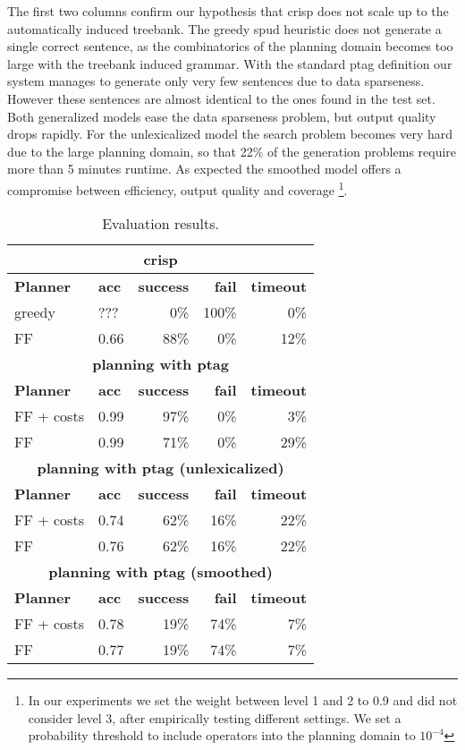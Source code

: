 The first two columns confirm our hypothesis that {\sc crisp} does not scale up to the automatically induced treebank. The greedy {\sc spud} heuristic does not generate a single correct sentence, as the combinatorics of the planning domain becomes too large with the treebank induced grammar. 
With the standard {\sc ptag} definition our system manages to generate only very few sentences due to data sparseness. However these sentences are almost identical to the ones found in the test set. Both generalized models ease the data sparseness problem, but output quality drops rapidly. For the unlexicalized model the search problem becomes very hard due to the large planning domain, so that 22\% of the generation problems require more than 5 minutes runtime. As expected the smoothed model offers a compromise between efficiency, output quality and coverage 
\footnote{In our experiments we set the weight between level 1 and 2 to 0.9 and did not consider level 3, after empirically testing different settings. We set a probability threshold to include operators into the planning domain to $10^{-4}$}.

\begin{table}
    \caption{\label{results} Evaluation results.}
    \begin{center}
    \begin{tabular}{|l|l|r|r|r|}
    \multicolumn{5}{c}{\sc crisp}\\ 
    \hline
     {\bf Planner }  & {\bf acc}& {\bf success} & {\bf fail} & {\bf timeout} \\ \hline 
     greedy         & ??? & 0\% & 100\% & 0\%  \\ \hline 
     FF         &  0.66 & 88\% & 0\% & 12\% \\ \hline 
    \multicolumn{5}{c}{\bf planning with {\sc ptag}}\\\hline
    {\bf Planner }  & {\bf acc}& {\bf success} & {\bf fail} & {\bf timeout} \\ \hline 
     FF + costs &  0.99 &  97\% & 0\% & 3\% \\ \hline
     FF         &  0.99 & 71\% & 0\% &  29\% \\ \hline
    \multicolumn{5}{c}{\bf planning with {\sc ptag} (unlexicalized)}\\\hline
    {\bf Planner }  & {\bf acc}& {\bf success} & {\bf fail} & {\bf timeout} \\ \hline 
     FF + costs & 0.74 & 62\% & 16\% & 22\%\\ \hline
     FF & 0.76 & 62\% & 16\% &  22\%\\ \hline
    \multicolumn{5}{c}{\bf planning with {\sc ptag} (smoothed)}\\\hline
    {\bf Planner }  & {\bf acc}& {\bf success} & {\bf fail} & {\bf timeout} \\ \hline 
     FF + costs & 0.78 & 19\% & 74\% & 7\% \\ \hline
     FF & 0.77 & 19\% & 74\% & 7\% \\ \hline
    \end{tabular}
    \end{center}
\end{table}


